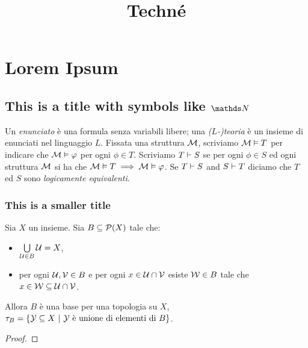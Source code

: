\documentclass{techne}
\title{Techné}
\begin{document}
	\thispagestyle{empty}
	\maketitle
	
\chapter{Lorem Ipsum}
\lipsum[3]
\section{This is a title with symbols like $\NN$}
\lipsum[5]
\begin{definition}
	Un \emph{enunciato} è una formula senza variabili libere; una \emph{($L$-)teoria} è un insieme di enunciati nel linguaggio $L$. Fissata una struttura $\mathcal{M}$, scriviamo $\mathcal{M} \vDash T$ per indicare che $\mathcal{M} \vDash \varphi$ per ogni $\phi \in T$. Scriviamo $T \vdash S$ se per ogni $\phi \in S$ ed ogni struttura $\mathcal{M}$ si ha che $\mathcal{M} \vDash T \implies \mathcal{M} \vDash \varphi$. Se $T \vdash S$ and $S \vdash T$ diciamo che $T$ ed $S$ sono \emph{logicamente equivalenti}.
\end{definition}
\lipsum[5]

\subsection{This is a smaller title}
\lipsum[5]
\begin{theorem}
	Sia $X$ un insieme. Sia $B \subseteq \mathcal{P}(X)$ tale che:
	\begin{itemize}
		\item $\bigcup\limits_{\mathcal{U} \in B}\mathcal{U} = X$,
		\item  per ogni $\mathcal{U}, \mathcal{V} \in B$ e per ogni $x \in \mathcal{U} \cap \mathcal{V}$ esiste $\mathcal{W} \in B$ tale che $x \in \mathcal{W} \subseteq \mathcal{U} \cap \mathcal{V}$.
	\end{itemize}
	Allora $B$ è una base per una topologia su $X$, $\tau_{B} = \{\cl{Y} \subseteq X \ \vert \ \cl{Y} \ \text{è unione di elementi di} \ B\}$.
\end{theorem}
\begin{proof}
\lipsum[5]
\end{proof}
\lipsum[4]
\end{document}

